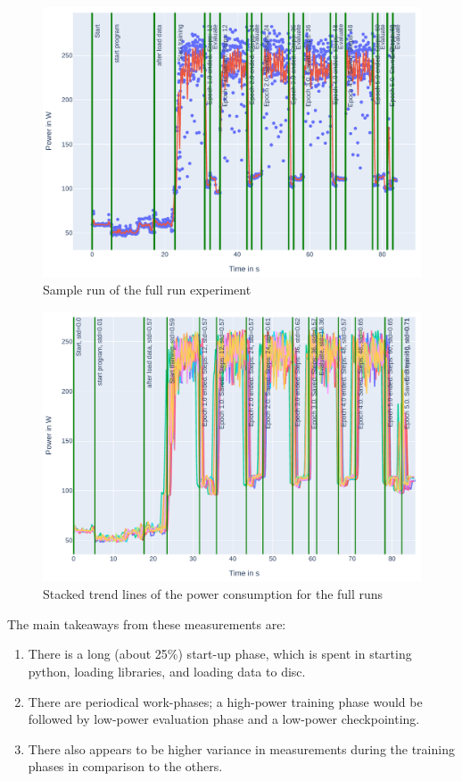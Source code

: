 \begin{figure}
    \includegraphics[width=\linewidth]{power-measurements/measurements_roberta_full_0714010405/plot.pdf}
    \caption{Sample run of the full run experiment}
    \label{fig:plot_full}
\end{figure}

\begin{figure}
    \includegraphics[width=\linewidth]{power-measurements/stacked_plots/roberta_full_0714.pdf}
    \caption{Stacked trend lines of the power consumption for the full runs}
    \label{fig:plot_full_stacked}
\end{figure}

The main takeaways from these measurements are:

\begin{enumerate}
    \item There is a long (about 25\%) start-up phase, which is spent in starting python, loading libraries, and loading data to disc.
    \item There are periodical work-phases; a high-power training phase would be followed by low-power evaluation phase and a low-power checkpointing.
    \item There also appears to be higher variance in measurements during the training phases in comparison to the others.
\end{enumerate}

